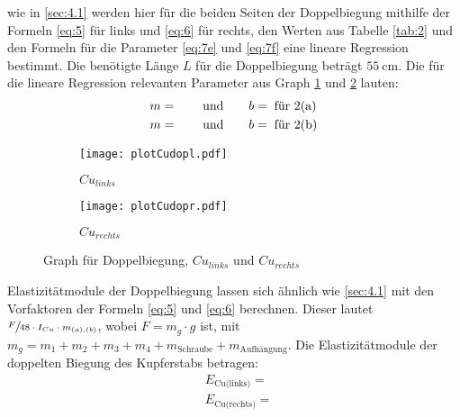 \justifying wie in \ref{sec:4.1} werden hier für die beiden Seiten der Doppelbiegung mithilfe der Formeln \eqref{eq:5} für
links und \eqref{eq:6} für rechts, den Werten aus Tabelle \ref{tab:2} und den Formeln für die Parameter \eqref{eq:7e} und \eqref{eq:7f} eine 
lineare Regression bestimmt. Die benötigte Länge $L$ für die Doppelbiegung beträgt $\SI{55}{\centi\meter}$. Die für die lineare Regression relevanten 
Parameter aus Graph \ref{fig:2a} und \ref{fig:2b} lauten:
\begin{subequations}\label{eq:16}
\begin{align}
    m &= \text{} \qquad \text{und} \qquad
    b = \text{}\label{eq:16a} \text{\;für 2(a)}\\
    m &= \text{} \qquad \text{und} \qquad
    b = \text{}\label{eq:16b} \text{\;für 2(b)}
\end{align}
\end{subequations}
\begin{figure}[H]
\begin{subfigure}{0.495\linewidth}
    \centering
    \texttt{[image: plotCudopl.pdf]}
    \caption{$Cu_{links}$}
    \label{fig:2a}
\end{subfigure}
\begin{subfigure}{0.495\linewidth}
    \centering
    \texttt{[image: plotCudopr.pdf]}
    \caption{$Cu_{rechts}$}
    \label{fig:2b}
\end{subfigure}
\caption{Graph für Doppelbiegung, $Cu_{links}$ und $Cu_{rechts}$}
\label{fig:2}
\end{figure}

\justifying Elastizitätmodule der Doppelbiegung lassen sich ähnlich wie \ref{sec:4.1} mit den Vorfaktoren der Formeln \eqref{eq:5} und \eqref{eq:6}
berechnen. Dieser lautet $\sfrac{F}{48 \cdot I_{Cu} \cdot m_{(a),(b)}}$, wobei $F = m_g\cdot g$ ist, mit $m_g = m_1 + m_2 + m_3 + m_4 + m_{\text{Schraube}}
+ m_{\text{Aufhängung}}$.
Die Elastizitätmodule der doppelten Biegung des Kupferstabs betragen:
\begin{align}
    &E_{\text{Cu(links)}} = \text{} \label{eq:17}\\
    &E_{\text{Cu(rechts)}} = \text{} \label{eq:18}
\end{align}



